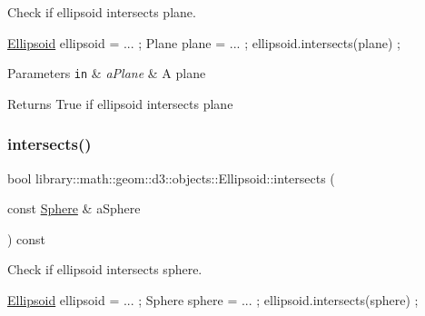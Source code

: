 Check if ellipsoid intersects plane. 


\begin{DoxyCode}
\hyperlink{classlibrary_1_1math_1_1geom_1_1d3_1_1objects_1_1_ellipsoid_aae81fe0edc7f0e8d4590ea89ae73cb14}{Ellipsoid} ellipsoid = ... ;
Plane plane = ... ;
ellipsoid.intersects(plane) ;
\end{DoxyCode}



\begin{DoxyParams}[1]{Parameters}
\mbox{\tt in}  & {\em a\+Plane} & A plane \\
\hline
\end{DoxyParams}
\begin{DoxyReturn}{Returns}
True if ellipsoid intersects plane 
\end{DoxyReturn}
\mbox{\label{classlibrary_1_1math_1_1geom_1_1d3_1_1objects_1_1_ellipsoid_aa9d3833e3d2be95ff00d7af32fe9b15e}} 
\subsubsection{\texorpdfstring{intersects()}{intersects()}\hspace{0.1cm}{\footnotesize\ttfamily [7/9]}}
{\footnotesize\ttfamily bool library\+::math\+::geom\+::d3\+::objects\+::\+Ellipsoid\+::intersects (\begin{DoxyParamCaption}\item[{const \hyperlink{classlibrary_1_1math_1_1geom_1_1d3_1_1objects_1_1_sphere}{Sphere} \&}]{a\+Sphere }\end{DoxyParamCaption}) const}



Check if ellipsoid intersects sphere. 


\begin{DoxyCode}
\hyperlink{classlibrary_1_1math_1_1geom_1_1d3_1_1objects_1_1_ellipsoid_aae81fe0edc7f0e8d4590ea89ae73cb14}{Ellipsoid} ellipsoid = ... ;
Sphere sphere = ... ;
ellipsoid.intersects(sphere) ;
\end{DoxyCode}



